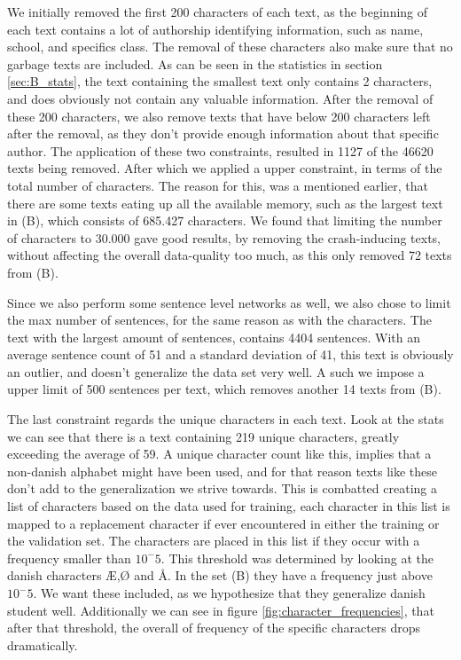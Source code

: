 We initially removed the first 200 characters of each text, as the beginning
of each text contains a lot of authorship identifying information, such as
name, school, and specifics class. The removal of these characters also
make sure that no garbage texts are included. As can be seen in the
statistics in section \ref{sec:B_stats}, the text containing the 
smallest text only contains 2 characters, and does obviously not contain
any valuable information. After the removal of these 200 characters, we also
remove texts that have below 200 characters left after the removal,
as they don't provide enough information about that specific author.
The application of these two constraints, resulted in 1127 of the 46620
texts being removed. After which we applied a upper constraint, in
terms of the total number of characters. The reason for this,
was a mentioned earlier, that there are some texts eating up
all the available memory, such as the largest text in (B), which consists
of 685.427 characters. We found that limiting the number of characters to 30.000
gave good results, by removing the crash-inducing texts, without affecting the
overall data-quality too much, as this only removed 72 texts from (B).

Since we also perform some sentence level networks as well, we also chose to
limit the max number of sentences, for the same reason as with the characters.
The text with the largest amount of sentences, contains 4404 sentences. With
an average sentence count of 51 and a standard deviation of 41, this text is
obviously an outlier, and doesn't generalize the data set very well. A such we
impose a upper limit of 500 sentences per text, which removes another 14 texts
from (B).

The last constraint regards the unique characters in each text. Look at the
stats we can see that there is a text containing 219 unique characters, greatly
exceeding the average of 59. A unique character count like this, implies that a
non-danish alphabet might have been used, and for that reason texts like these
don't add to the generalization we strive towards. This is combatted creating
a list of characters based on the data used for training, each character in
this list is mapped to a replacement character if ever encountered in either
the training or the validation set. The characters are placed in this list if
they occur with a frequency smaller than $10^-5$. This threshold was determined
by looking at the danish characters Æ,Ø and Å. In the set (B) they have
a frequency just above $10^-5$. We want these included, as we hypothesize
that they generalize danish student well. Additionally we can see in figure
\ref{fig:character_frequencies}, that after that threshold, the overall of
frequency of the specific characters drops dramatically.

